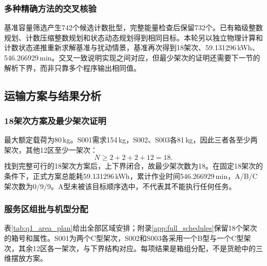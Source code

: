 \documentclass[withoutpreface,colorprint]{format}
\numberwithin{equation}{section}
\numberwithin{figure}{section}
\numberwithin{table}{section}
\begin{document}
\subsubsection{多种精确方法的交叉核验}
基准容量筛选产生742个候选计数批型，完整能量检查后保留732个。已有箱级整数规划、计数压缩整数规划和状态动态规划得到相同目标。本轮另以独立物理计算和计数状态递推重新求解基准与扰动情景，基准再次得到18架次、59.131296\,kWh、546.266929\,min。交叉一致说明实现之间对应，但最少架次的证明还需要下一节的解析下界，而非只靠多个程序输出相同值。

\subsection{运输方案与结果分析}
\subsubsection{18架次方案及最少架次证明}
最大额定载荷为80\,kg。S001需求154\,kg，S002、S003各81\,kg，因此三者各至少两架次，其他12区至少一架次：
\begin{equation}
 N\ge2+2+2+12=18.
\label{eq:q1_sortie_lb}
\end{equation}
找到完整可行的18架次方案后，上下界闭合，故最少架次数为18。在固定18架次的条件下，正式方案总能耗59.131296\,kWh，累计作业时间546.266929\,min，A/B/C架次数为0/9/9。A型未被该目标顺序选中，不代表其不能执行任何任务。

\subsubsection{服务区组批与机型分配}
表\ref{tab:q1_area_plan}给出全部区域安排；附录\ref{app:full_schedules}保留18个架次的箱号和属性。S001为两个C型架次，S002和S003各采用一个B型与一个C型架次，其余12区各一架次，与下界结构对应。每项结果是箱组分配，不是货舱中的三维摆放方案。
\end{document}
